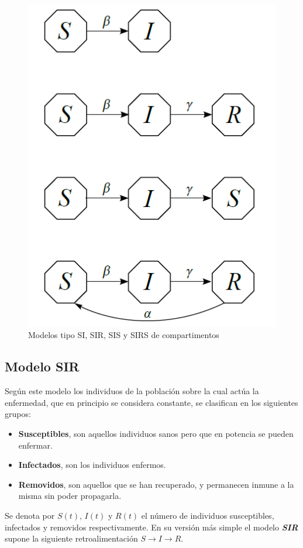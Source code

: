 \documentclass[journal]{IEEEtran}
\begin{document}
\begin{figure}[H]
  \centering  
  \includegraphics[scale=0.34]{Modelos.png} 
  \caption{Modelos tipo SI, SIR, SIS y SIRS de compartimentos}
  \end{figure}
\subsection{Modelo SIR}
Según este modelo \cite{Anderson} los individuos de la población
sobre la cual actúa la enfermedad, que en principio se considera constante, se
clasifican en los siguientes grupos:

\begin{itemize}
  \item \textbf{Susceptibles}, son aquellos individuos sanos pero que en potencia se pueden
  enfermar.
  \item \textbf{Infectados}, son los individuos enfermos.
  \item \textbf{Removidos}, son aquellos que se han recuperado, y permanecen inmune a la misma sin poder propagarla.
\end{itemize}

Se denota por $S(t)$, $I(t)$ y $R(t)$ el número de individuos susceptibles, infectados y removidos respectivamente.
En su versión más simple el modelo \textbf{\textit{SIR}} supone la siguiente retroalimentación $S \rightarrow I \rightarrow R$.\newline
  
\end{document}
